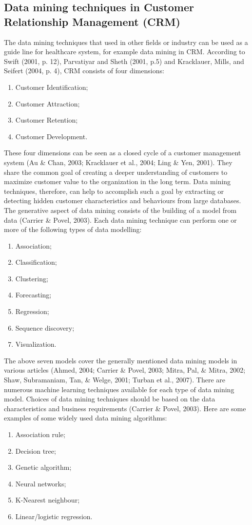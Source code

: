 \documentclass[a4paper,11pt]{article}
\begin{document}
\subsection{Data mining techniques in Customer Relationship Management (CRM)}
The data mining techniques that used in other fields or industry can be used as a guide line for healthcare system, for example data mining in CRM. According to Swift (2001, p. 12), Parvatiyar and Sheth (2001, p.5) and Kracklauer, Mills, and Seifert (2004, p. 4), CRM consists of four dimensions:
\begin{enumerate}
\item Customer Identification;
\item Customer Attraction;
\item Customer Retention;
\item Customer Development.
\end{enumerate}
 These four dimensions can be seen as a closed cycle of a customer management system (Au \& Chan, 2003; Kracklauer et al., 2004; Ling \& Yen, 2001). They share the common goal of creating a deeper understanding of customers to maximize customer value to the organization in the long term. Data mining techniques, therefore, can help to accomplish such a goal by extracting or detecting hidden customer characteristics and behaviours from large databases. The generative aspect of data mining consists of the building of a model from data (Carrier \& Povel, 2003). Each data mining technique can perform one or more of the following types of data modelling: 
 \begin{enumerate}
\item Association; 
\item Classification; 
\item Clustering; 
\item Forecasting; 
\item Regression; 
\item Sequence discovery; 
\item Visualization. 
 \end{enumerate}
 The above seven models cover the generally mentioned data mining models in various articles (Ahmed, 2004; Carrier \& Povel, 2003; Mitra, Pal, \& Mitra, 2002; Shaw, Subramaniam, Tan, \& Welge, 2001; Turban et al., 2007). There are numerous machine learning techniques available for each type of data mining model. Choices of data mining techniques should be based on the data characteristics and business requirements (Carrier \& Povel, 2003). Here are some examples of some widely used data mining algorithms: 
 \begin{enumerate}
 \item Association rule; 
 \item Decision tree; 
 \item Genetic algorithm; 
 \item Neural networks; 
 \item K-Nearest neighbour; 
 \item Linear/logistic regression.\cite{ref10}
 \end{enumerate}
 
\end{document}
